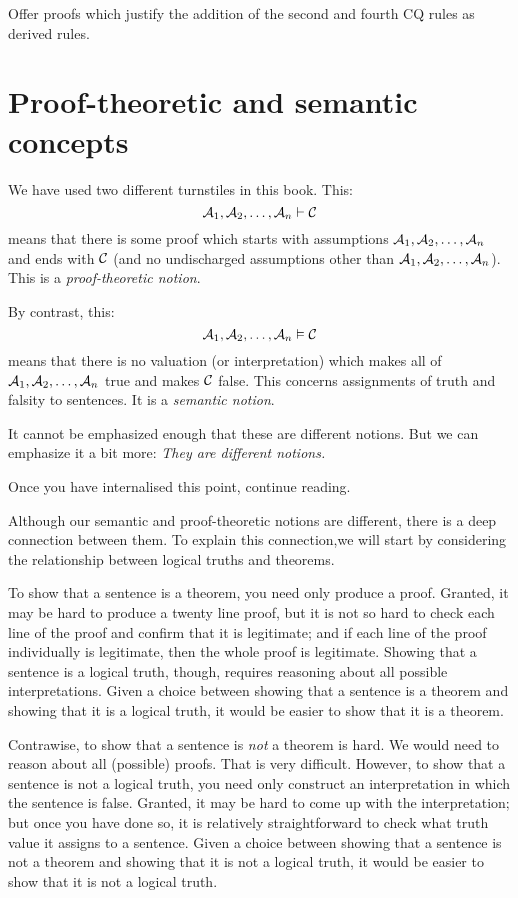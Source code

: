\practiceproblems

\problempart
Offer proofs which justify the addition of the second and fourth CQ rules as derived rules.



\chapter{Proof-theoretic and semantic concepts}
We have used two different turnstiles in this book.  This:
$$\mathcal{A}_1, \mathcal{A}_2, \ldots, \mathcal{A}_n \vdash \mathcal{C}$$
means that there is some proof which starts with assumptions $\mathcal{A}_1, \mathcal{A}_2, \ldots, \mathcal{A}_n$ and ends with $\mathcal{C}$ (and no undischarged assumptions other than $\mathcal{A}_1, \mathcal{A}_2, \ldots, \mathcal{A}_n$). This is a \emph{proof-theoretic notion}.

By contrast, this:
$$\mathcal{A}_1, \mathcal{A}_2, \ldots, \mathcal{A}_n \vDash \mathcal{C}$$
means that there is no valuation (or interpretation) which makes all of $\mathcal{A}_1, \mathcal{A}_2, \ldots, \mathcal{A}_n$ true and makes $\mathcal{C}$ false. This concerns assignments of truth and falsity to sentences. It is a \emph{semantic notion}.

It cannot be emphasized enough that these are different notions. But we can emphasize it a bit more: \emph{They are different notions.}

Once you have internalised this point, continue reading. 

Although our semantic and proof-theoretic notions are different, there is a deep connection between them. To explain this connection,we will start by considering the relationship between logical truths and theorems.

To show that a sentence is a theorem, you need only produce a proof. Granted, it may be hard to produce a twenty line proof, but it is not so hard to check each line of the proof and confirm that it is legitimate; and if each line of the proof individually is legitimate, then the whole proof is legitimate. Showing that a sentence is a logical truth, though, requires reasoning about all possible interpretations. Given a choice between showing that a sentence is a theorem and showing that it is a logical truth, it would be easier to show that it is a theorem.

Contrawise, to show that a sentence is \emph{not} a theorem is hard. We would need to reason about all (possible) proofs. That is very difficult. However, to show that a sentence is not a logical truth, you need only construct an interpretation in which the sentence is false. Granted, it may be hard to come up with the interpretation; but once you have done so, it is relatively straightforward to check what truth value it assigns to a sentence. Given a choice between showing that a sentence is not a theorem and showing that it is not a logical truth, it would be easier to show that it is not a logical truth.


